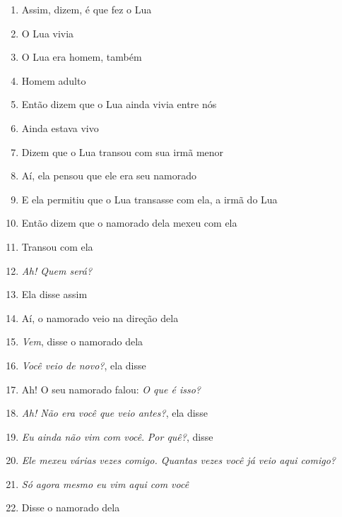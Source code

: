 \begin{enumerate}
\item Assim, dizem, é que fez o Lua
\item O Lua vivia
\item O Lua era homem, também
\item Homem adulto

\begin{center}\end{center}

\item Então dizem que o Lua ainda vivia entre nós
\item Ainda estava vivo
\item Dizem que o Lua transou com sua irmã menor
\item Aí, ela pensou que ele era seu namorado
\item E ela permitiu que o Lua transasse com ela, a irmã do Lua

\begin{center}\end{center}

\item Então dizem que o namorado dela mexeu com ela
\item Transou com ela
\item \textit{Ah! Quem será?}
\item Ela disse assim
\item Aí, o namorado veio na direção dela
\item \textit{Vem}, disse o namorado dela
\item \textit{Você veio de novo?}, ela disse

\begin{center}\end{center}

\item Ah! O seu namorado falou: \textit{O que é isso?}
\item \textit{Ah! Não era você que veio antes?}, ela disse
\item \textit{Eu ainda não vim com você}. \textit{Por quê?}, disse
\item \textit{Ele mexeu várias vezes comigo. Quantas vezes você já veio aqui comigo?}
\item \textit{Só agora mesmo eu vim aqui com você}
\item Disse o namorado dela

\begin{center}\end{center}


\end{enumerate}
